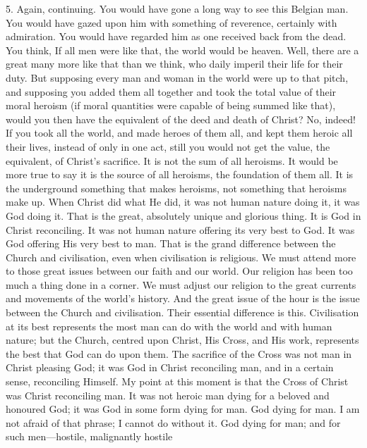 \documentclass[12pt,a5paper,twoside,titlepage]{book}
\begin{document}
5. Again, continuing. You would have gone a 
long way to see this Belgian man. You would 
have gazed upon him with something of reverence, 
certainly with admiration. You would 
have regarded him as one received back from 
the dead. You think, If all men were like that, 
the world would be heaven. Well, there are a 
great many more like that than we think, who 
daily imperil their life for their duty. But 
supposing every man and woman in the world 
were up to that pitch, and supposing you added 
them all together and took the total value of 
their moral heroism (if moral quantities were 
capable of being summed like that), would you 
then have the equivalent of the deed and death 
of Christ? No, indeed! If you took all the 
world, and made heroes of them all, and kept 
them heroic all their lives, instead of only in one 
act, still you would not get the value, the equivalent, 
of Christ's sacrifice. It is not the sum of all 
heroisms. It would be more true to say it is the 
source of all heroisms, the foundation of them 
all. It is the underground something that makes 
heroisms, not something that heroisms make 
up. When Christ did what He did, it was not 
human nature doing it, it was God doing it. 
That is the great, absolutely unique and 
glorious thing. It is God in Christ reconciling. 
It was not human nature offering its very best 
to God. It was God offering His very best to 
man. That is the grand difference between the 
Church and civilisation, even when civilisation 
is religious. We must attend more to those 
great issues between our faith and our world. 
Our religion has been too much a thing done 
in a corner. We must adjust our religion to 
the great currents and movements of the 
world's history. And the great issue of the 
hour is the issue between the Church and 
civilisation. Their essential difference is this. 
Civilisation at its best represents the most 
man can do with the world and with human 
nature; but the Church, centred upon Christ, 
His Cross, and His work, represents the best 
that God can do upon them. The sacrifice 
of the Cross was not man in Christ pleasing 
God; it was God in Christ reconciling man, 
and in a certain sense, reconciling Himself. My 
point at this moment is that the Cross of Christ 
was Christ reconciling man. It was not heroic 
man dying for a beloved and honoured God; it
was God in some form dying for man. God 
dying for man. I am not afraid of that phrase; 
I cannot do without it. God dying for man; 
and for such men---hostile, malignantly hostile 
\end{document}
